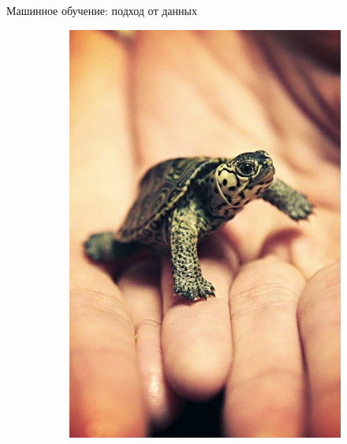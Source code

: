 \documentclass[aspectratio=169]{beamer}
\begin{document}
\begin{frame}{Машинное обучение: подход от данных}
\begin{figure}
\begin{subfigure}[b]{.1\linewidth}
            \includegraphics[width=\linewidth]{graphs/fig14_6.jpg}
        \end{subfigure}
        \begin{subfigure}[b]{.1\linewidth}

\end{subfigure}
\end{figure}
\end{frame}
\end{document}
